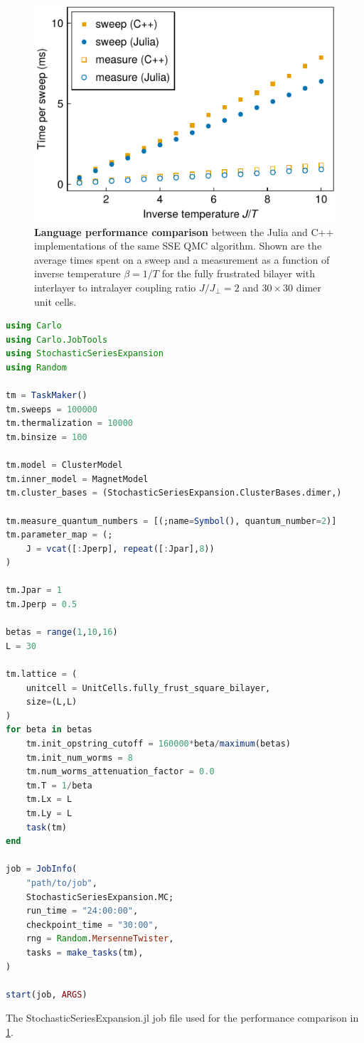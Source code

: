 \documentclass{SciPost}
\begin{document}
\begin{figure}
\begin{center}
\includegraphics{figs/language_comparison.pdf}
\end{center}
\caption{\textbf{Language performance comparison} between the Julia and C++ implementations of the same SSE QMC algorithm. Shown are the average times spent on a sweep and a measurement as a function of inverse temperature $\beta=1/T$ for the fully frustrated bilayer with interlayer to intralayer coupling ratio $J/J_\perp = 2$ and $30\times 30$ dimer unit cells. }
\label{fig:language_comparison}
\end{figure}
\begin{lstfloat}
\begin{lstlisting}[language=julia]
using Carlo
using Carlo.JobTools
using StochasticSeriesExpansion
using Random

tm = TaskMaker()
tm.sweeps = 100000
tm.thermalization = 10000
tm.binsize = 100

tm.model = ClusterModel
tm.inner_model = MagnetModel
tm.cluster_bases = (StochasticSeriesExpansion.ClusterBases.dimer,)

tm.measure_quantum_numbers = [(;name=Symbol(), quantum_number=2)]
tm.parameter_map = (;
    J = vcat([:Jperp], repeat([:Jpar],8))
)

tm.Jpar = 1
tm.Jperp = 0.5

betas = range(1,10,16)
L = 30

tm.lattice = (
    unitcell = UnitCells.fully_frust_square_bilayer,
    size=(L,L)
)
for beta in betas
    tm.init_opstring_cutoff = 160000*beta/maximum(betas)
    tm.init_num_worms = 8
    tm.num_worms_attenuation_factor = 0.0
    tm.T = 1/beta
    tm.Lx = L
    tm.Ly = L
    task(tm)
end

job = JobInfo(
    "path/to/job",
    StochasticSeriesExpansion.MC;
    run_time = "24:00:00",
    checkpoint_time = "30:00",
    rng = Random.MersenneTwister,
    tasks = make_tasks(tm),
)

start(job, ARGS)
\end{lstlisting}
\caption{The StochasticSeriesExpansion.jl job file used for the performance comparison in \cref{fig:language_comparison}.}
\label{lst:language_comparison}
\end{lstfloat}
\end{document}
